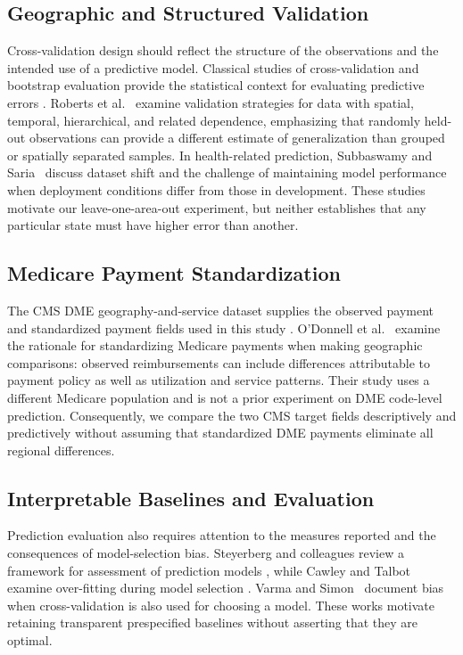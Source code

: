 \subsection{Geographic and Structured Validation}
Cross-validation design should reflect the structure of the observations and the intended use of a predictive model. Classical studies of cross-validation and bootstrap evaluation provide the statistical context for evaluating predictive errors \citep{kohavi1995,arlot2010}. Roberts et al.~\citep{roberts2017} examine validation strategies for data with spatial, temporal, hierarchical, and related dependence, emphasizing that randomly held-out observations can provide a different estimate of generalization than grouped or spatially separated samples. In health-related prediction, Subbaswamy and Saria~\citep{subbaswamy2020} discuss dataset shift and the challenge of maintaining model performance when deployment conditions differ from those in development. These studies motivate our leave-one-area-out experiment, but neither establishes that any particular state must have higher error than another.

\subsection{Medicare Payment Standardization}
The CMS DME geography-and-service dataset supplies the observed payment and standardized payment fields used in this study \citep{cmsdme2023}. O'Donnell et al.~\citep{odonnell2013} examine the rationale for standardizing Medicare payments when making geographic comparisons: observed reimbursements can include differences attributable to payment policy as well as utilization and service patterns. Their study uses a different Medicare population and is not a prior experiment on DME code-level prediction. Consequently, we compare the two CMS target fields descriptively and predictively without assuming that standardized DME payments eliminate all regional differences.

\subsection{Interpretable Baselines and Evaluation}
Prediction evaluation also requires attention to the measures reported and the consequences of model-selection bias. Steyerberg and colleagues review a framework for assessment of prediction models \citep{steyerberg2010}, while Cawley and Talbot examine over-fitting during model selection \citep{cawley2010}. Varma and Simon~\citep{varma2006} document bias when cross-validation is also used for choosing a model. These works motivate retaining transparent prespecified baselines without asserting that they are optimal.

